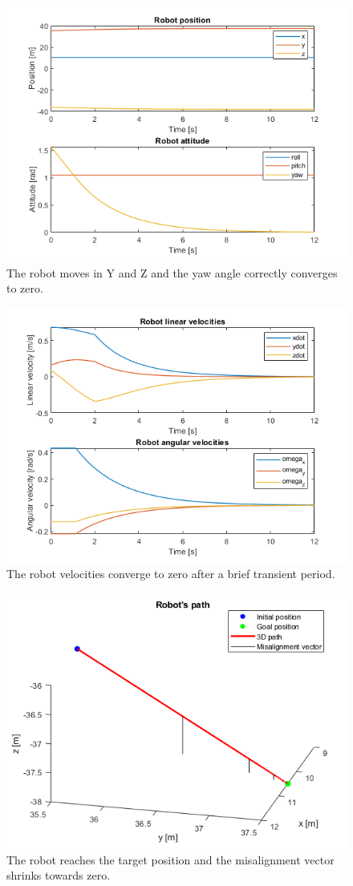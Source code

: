\documentclass{article}
\begin{document}
\begin{figure}[H]
	\centering
	\includegraphics[width=0.7\linewidth]{images/Ex1/HorAtt_LowPrio_DifferentStartpos_DifferentEndpos_PosAndAtt}
	\caption{The robot moves in Y and Z and the yaw angle correctly converges to zero.}
	\label{fig:q3case3a}
\end{figure}
\begin{figure}[H]
	\centering
	\includegraphics[width=0.7\linewidth]{images/Ex1/HorAtt_LowPrio_DifferentStartpos_DifferentEndpos_LinAngVelocities}
	\caption{The robot velocities converge to zero after a brief transient period.}
	\label{fig:q3case3b}
\end{figure}
\begin{figure}[H]
	\centering
	\includegraphics[width=0.7\linewidth]{images/Ex1/HorAtt_LowPrio_DifferentStartpos_DifferentEndpos_Path}
	\caption{The robot reaches the target position and the misalignment vector shrinks towards zero.}
	\label{fig:q3case3c}
\end{figure}
\end{document}

